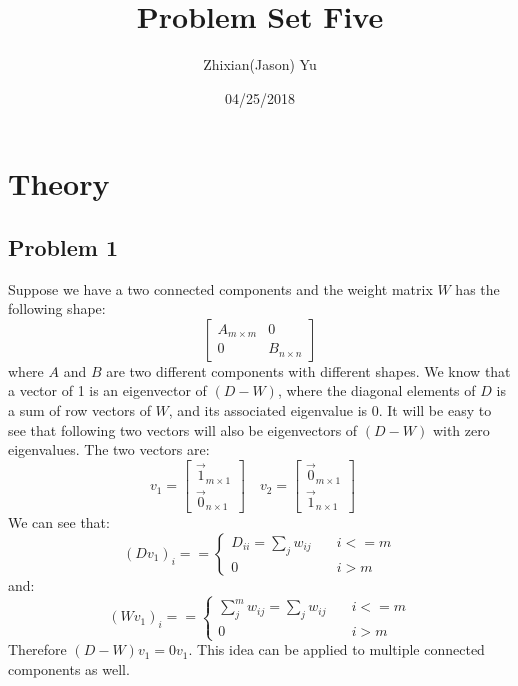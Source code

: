 \documentclass{article}
\title{Problem Set Five}
\date{04/25/2018}
\author{Zhixian(Jason) Yu}
\begin{document}
\maketitle
{}
\newpage

\section{Theory}

\subsection*{Problem 1}
Suppose we have a two connected components and the weight matrix $W$ has the following shape:
\[
\begin{bmatrix}
A_{m\times m} & 0\\
0 & B_{n\times n}
\end{bmatrix}
\]
where $A$ and $B$ are two different components with different shapes. We know that a vector of 1 is an eigenvector of $(D-W)$, where the diagonal elements of $D$ is a sum of row vectors of $W$, and its associated eigenvalue is 0. It will be easy to see that following two vectors will also be eigenvectors of $(D-W)$ with zero eigenvalues. The two vectors are:
\[
  v_1=
  \begin{bmatrix}
    \vec{1}_{m\times 1} \\
    \vec{0}_{n \times 1}
  \end{bmatrix}\quad
  v_2=
  \begin{bmatrix}
    \vec{0}_{m\times 1} \\
    \vec{1}_{n \times 1}
  \end{bmatrix}\quad
\]
We can see that:
\begin{equation*}
(Dv_1)_{i} = =
  \begin{cases}
    D_{ii} = \sum_j w_{ij}       & \quad i <= m\\
    0  & \quad i > m
  \end{cases}
\end{equation*}
and:
\begin{equation*}
(Wv_1)_{i} = =
  \begin{cases}
    \sum_j^m w_{ij} = \sum_j w_{ij}       & \quad i <= m\\
    0  & \quad i > m
  \end{cases}
\end{equation*}
Therefore $(D-W)v_1 = 0v_1$. This idea can be applied to multiple connected components as well. 
\end{document}
